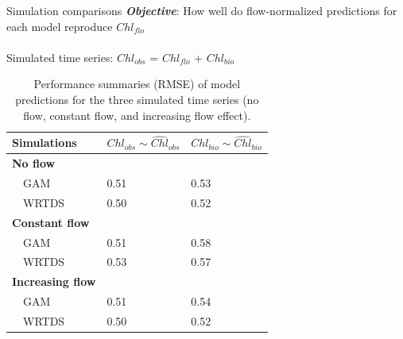 \documentclass[serif]{beamer}\usepackage[]{graphicx}\usepackage[]{color}
\newcommand{\Bigtxt}[1]{\textbf{\textit{#1}}}
\begin{document}
\begin{frame}{Simulation comparisons}
\Bigtxt{Objective}: How well do flow-normalized predictions for each model reproduce $Chl_{flo}$ \\~\\
Simulated time series: $Chl_{obs}$ = $Chl_{flo}$ + $Chl_{bio}$
\scriptsize
\begin{table}[!tbp]
\caption{Performance summaries (RMSE) of model predictions for the three simulated time series (no flow, constant flow, and increasing flow effect).\label{tab:simperf}} 
\begin{center}
\begin{tabular}{lll}
\hline\hline
\multicolumn{1}{l}{Simulations}&\multicolumn{1}{c}{$Chl_{obs} \sim \widehat{Chl}_{obs}$}&\multicolumn{1}{c}{$Chl_{bio} \sim \widehat{Chl}_{bio}$}\tabularnewline
\hline
{\bfseries No flow}&&\tabularnewline
~~GAM&0.51&0.53\tabularnewline
~~WRTDS&0.50&0.52\tabularnewline
\hline
{\bfseries Constant flow}&&\tabularnewline
~~GAM&0.51&0.58\tabularnewline
~~WRTDS&0.53&0.57\tabularnewline
\hline
{\bfseries Increasing flow}&&\tabularnewline
~~GAM&0.51&0.54\tabularnewline
~~WRTDS&0.50&0.52\tabularnewline
\hline
\end{tabular}\end{center}

\end{table}

\end{frame}
\end{document}
